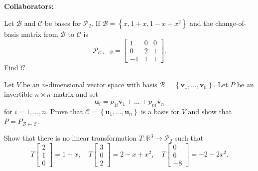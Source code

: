 \documentclass[11pt,letterpaper,boxed]{hmcpset}
\newcommand{\R}{\mathbb{R}}
\newcommand{\crb}[1]{\left\{ #1 \right\}}
\newcommand{\VEC}[1]{\ensuremath{\mathbf{#1}}\xspace}
\begin{document}
\noindent\textbf{Collaborators:} 


\begin{problem}[Poole 6.3 \#16]
Let $\mathcal{B}$ and $\mathcal{C}$ be bases for $\mathcal{P}_2$. If $\mathcal{B}=\crb{x,1+x,1-x+x^2}$ and
the change-of-basis matrix from $\mathcal{B}$ to $\mathcal{C}$ is
\[
	\mathcal{P}_{\mathcal{C}\leftarrow\mathcal{B}} = \begin{bmatrix}1 & 0 & 0\\0 & 2&1\\-1&1&1\end{bmatrix}.
\]
Find $\mathcal{C}$.
\end{problem}

\begin{solution}
\vfill
\end{solution}
\newpage

\begin{problem}[Poole 6.3 \#22]
Let $V$ be an $n$-dimensional vector space with basis $\mathcal{B}=\crb{\VEC{v}_1,...,\VEC{v}_n}$. Let
$P$ be an invertible $n \times n$ matrix and set
\[
	\VEC{u}_i = p_{1i}\VEC{v}_1+...+p_{ni}\VEC{v}_n
\]
for $i=1,...,n$. Prove that $\mathcal{C} = \crb{\VEC{u}_1,...,\VEC{u}_n}$ is a basis for $V$	 and show that
$P = P_{\mathcal{B}\leftarrow\mathcal{C}}$.
\end{problem}

\begin{solution}
\vfill
\end{solution}
\newpage

\begin{problem}[Poole 6.4 \#20]
Show that there is no linear transformation $T: \R^3 \rightarrow \mathcal{P}_2$ such that
\[
	T\begin{bmatrix}2\\1\\0\end{bmatrix}=1+x, \quad T\begin{bmatrix}3\\0\\2\end{bmatrix}=2-x+x^2, \quad T\begin{bmatrix}0\\6\\-8\end{bmatrix}=-2+2x^2.
\]
\end{problem}
\end{document}
